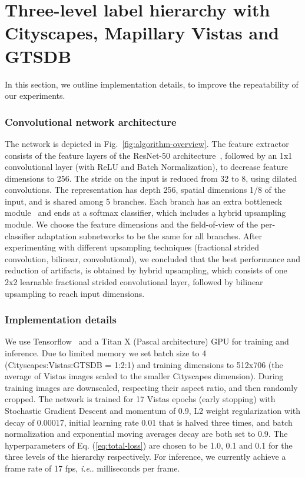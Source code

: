 \documentclass[letterpaper, 10 pt, conference]{ieeeconf}
\makeatletter
\DeclareRobustCommand\onedot{\futurelet\@let@token\@onedot}
\def\@onedot{\ifx\@let@token.\else.\null\fi\xspace}
\def\ie{\emph{i.e}\onedot}
\makeatother
\begin{document}
\section{Three-level label hierarchy with Cityscapes, Mapillary Vistas and GTSDB}
\label{sec:three-level-hierarchy}
In this section, we outline implementation details, to improve the repeatability of our experiments.

\subsubsection*{\textbf{Convolutional network architecture}}
The network is depicted in Fig.~\ref{fig:algorithm-overview}. The feature extractor consists of the feature layers of the ResNet-50 architecture~\cite{he2016deep}, followed by an 1x1 convolutional layer (with ReLU and Batch Normalization), to decrease feature dimensions to 256. The stride on the input is reduced from 32 to 8, using dilated convolutions. The representation has depth 256, spatial dimensions 1/8 of the input, and is shared among 5 branches. Each branch has an extra bottleneck module~\cite{he2016deep} and ends at a softmax classifier, which includes a hybrid upsampling module. We choose the feature dimensions and the field-of-view of the per-classifier adaptation subnetworks to be the same for all branches. After experimenting with different upsampling techniques (fractional strided convolution, bilinear, convolutional), we concluded that the best performance and reduction of artifacts, is obtained by hybrid upsampling, which consists of one 2x2 learnable fractional strided convolutional layer, followed by bilinear upsampling to reach input dimensions.

\subsubsection*{\textbf{Implementation details}}
We use Tensorflow~\cite{abadi2016tensorflow} and a Titan X (Pascal architecture) GPU for training and inference. Due to limited memory we set batch size to 4 (Cityscapes:Vistas:GTSDB = 1:2:1) and training dimensions to 512x706 (the average of Vistas images scaled to the smaller Cityscapes dimension). During training images are downscaled, respecting their aspect ratio, and then randomly cropped. The network is trained for 17 Vistas epochs (early stopping) with Stochastic Gradient Descent and momentum of 0.9, L2 weight regularization with decay of 0.00017, initial learning rate 0.01 that is halved three times, and batch normalization and exponential moving averages decay are both set to 0.9. The hyperparameters  of Eq. (\ref{eq:total-loss}) are chosen to be 1.0, 0.1 and 0.1 for the three levels of the hierarchy respectively. For inference, we currently achieve a frame rate of 17 fps, \ie 58 milliseconds per frame.
\end{document}
